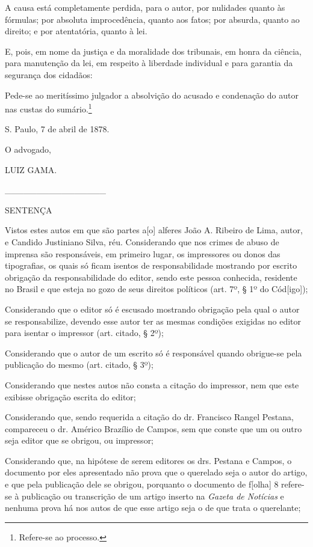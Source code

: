 A causa está completamente perdida, para o autor, por nulidades quanto
às fórmulas; por absoluta improcedência, quanto aos fatos; por absurda,
quanto ao direito; e por atentatória, quanto à lei.

E, pois, em nome da justiça e da moralidade dos tribunais, em honra da
ciência, para manutenção da lei, em respeito à liberdade individual e
para garantia da segurança dos cidadãos:

Pede-se ao meritíssimo julgador a absolvição do acusado e condenação do
autor nas custas do sumário.\footnote{Refere-se ao processo.}

S. Paulo, 7 de abril de 1878.

O advogado,

LUIZ GAMA.

\_\_\_\_\_\_\_\_\_\_\_\_\_\_\_\_

SENTENÇA

Vistos estes autos em que são partes a{[}o{]} alferes João A. Ribeiro de
Lima, autor, e Candido Justiniano Silva, réu. Considerando que nos
crimes de abuso de imprensa são responsáveis, em primeiro lugar, os
impressores ou donos das tipografias, os quais só ficam isentos de
responsabilidade mostrando por escrito obrigação da responsabilidade do
editor, sendo este pessoa conhecida, residente no Brasil e que esteja no
gozo de seus direitos políticos (art. 7º, § 1º do Cód{[}igo{]});

Considerando que o editor só é escusado mostrando obrigação pela qual o
autor se responsabilize, devendo esse autor ter as mesmas condições
exigidas no editor para isentar o impressor (art. citado, § 2º);

Considerando que o autor de um escrito só é responsável quando
obrigue-se pela publicação do mesmo (art. citado, § 3º);

Considerando que nestes autos não consta a citação do impressor, nem que
este exibisse obrigação escrita do editor;

Considerando que, sendo requerida a citação do dr. Francisco Rangel
Pestana, compareceu o dr. Américo Brazílio de Campos, sem que conste que
um ou outro seja editor que se obrigou, ou impressor;

Considerando que, na hipótese de serem editores os drs. Pestana e
Campos, o documento por eles apresentado não prova que o querelado seja
o autor do artigo, e que pela publicação dele se obrigou, porquanto o
documento de f{[}olha{]} 8 refere-se à publicação ou transcrição de um
artigo inserto na \emph{Gazeta de Notícias} e nenhuma prova há nos autos
de que esse artigo seja o de que trata o querelante;

